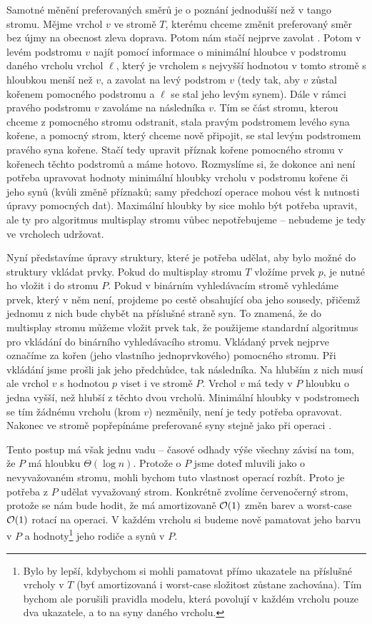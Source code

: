 Samotné měnění preferovaných směrů je o poznání jednodušší než v tango stromu.
Mějme vrchol $v$ ve stromě $T$, kterému chceme změnit preferovaný směr bez újmy
na obecnost zleva doprava. Potom nám stačí nejprve zavolat .
Potom v levém podstromu $v$ najít pomocí informace o minimální hloubce v
podstromu daného vrcholu vrchol $\ell$, který je vrcholem s nejvyšší hodnotou v
tomto stromě s hloubkou menší než $v$, a zavolat  na levý
podstrom $v$ (tedy tak, aby $v$ zůstal kořenem pomocného podstromu a $\ell$ se
stal jeho levým synem). Dále v rámci pravého podstromu $v$ zavoláme 
na následníka $v$. Tím se část stromu, kterou chceme z pomocného stromu
odstranit, stala pravým podstromem levého syna kořene, a pomocný strom, který
chceme nově připojit, se stal levým podstromem pravého syna kořene. Stačí tedy
upravit příznak kořene pomocného stromu v kořenech těchto podstromů a máme
hotovo. Rozmyslíme si, že dokonce ani není potřeba upravovat hodnoty minimální
hloubky vrcholu v podstromu kořene či jeho synů (kvůli změně příznaků; samy
předchozí operace  mohou vést k nutnosti úpravy pomocných dat).
Maximální hloubky by sice mohlo být potřeba upravit, ale ty pro algoritmus
multisplay stromu vůbec nepotřebujeme -- nebudeme je tedy ve vrcholech
udržovat.

Nyní představíme úpravy struktury, které je potřeba udělat, aby bylo možné do
struktury vkládat prvky.  Pokud do multisplay stromu $T$ vložíme prvek $p$, je
nutné ho vložit i do stromu $P$. Pokud v binárním vyhledávacím stromě vyhledáme
prvek, který v něm není, projdeme po cestě obsahující oba jeho sousedy, přičemž
jednomu z nich bude chybět na příslušné straně syn. To znamená, že do
multisplay stromu můžeme vložit prvek tak, že použijeme standardní algoritmus
pro vkládání do binárního vyhledávacího stromu. Vkládaný prvek nejprve označíme
za kořen (jeho vlastního jednoprvkového) pomocného stromu. Při vkládání jsme prošli
jak jeho předchůdce, tak následníka. Na hlubším z nich musí ale vrchol $v$ s
hodnotou $p$ viset i ve stromě $P$. Vrchol $v$ má tedy v $P$ hloubku o jedna vyšší,
než hlubší z těchto dvou vrcholů. Minimální hloubky v podstromech se tím
žádnému vrcholu (krom $v$) nezměnily, není je tedy potřeba opravovat. Nakonec
ve stromě popřepínáme preferované syny stejně jako při operaci .

Tento postup má však jednu vadu -- časové odhady výše všechny závisí na tom, že
$P$ má hloubku $\Theta(\log n)$. Protože o $P$ jsme doteď mluvili jako o
nevyvažovaném stromu, mohli bychom tuto vlastnost operací  rozbít.
Proto je potřeba z $P$ udělat vyvažovaný strom. Konkrétně zvolíme červenočerný
strom, protože se nám bude hodit, že má amortizovaně $\mathcal O(1)$ změn barev a
worst-case $\mathcal O(1)$ rotací na operaci. V každém vrcholu si budeme nově pamatovat
jeho barvu v $P$ a hodnoty\footnote{Bylo by lepší, kdybychom si mohli pamatovat
přímo ukazatele na příslušné vrcholy v $T$ (byť amortizovaná i worst-case složitost zůstane zachována). Tím bychom ale
porušili pravidla modelu, která povolují v každém vrcholu pouze dva ukazatele,
a to na syny daného vrcholu.} jeho rodiče a synů v $P$. 


